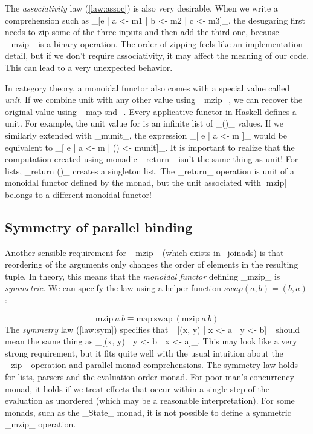 \documentclass{tmr}
\begin{document}
\UndefineShortVerb{\|}
\DefineShortVerb{\_}

The \textit{associativity} law (\ref{law:assoc}) is also very desirable. When we write a 
comprehension such as _[e | a <- m1 | b <- m2 | c <- m3]_, the desugaring first needs to zip some
of the three inputs and then add the third one, because _mzip_ is a binary operation. The order
of zipping feels like an implementation detail, but if we don't require associativity, it may 
affect the meaning of our code. This can lead to a very unexpected behavior.

In category theory, a monoidal functor also comes with a special value called 
\textit{unit}. If we combine unit with any other value using _mzip_, we can recover the original
value using _map snd_. Every applicative functor in Haskell defines a unit. For example,
the unit value for  is an infinite list of _()_ values. If we similarly extended 
 with _munit_, the expression _[ e | a <- m ]_ would be equivalent to
_[ e | a <- m | () <- munit]_. It is important to realize that the computation created using monadic 
_return_ isn't the same thing as unit! For lists, _return ()_ creates a singleton list. The 
_return_ operation is unit of a monoidal functor defined by the monad, but the unit associated 
with |mzip| belongs to a different monoidal functor! 


\subsection{Symmetry of parallel binding}

Another sensible requirement for _mzip_ (which exists in \fsharp \ joinads) is that reordering of 
the arguments only changes the order of elements in the resulting tuple. In theory, this means that 
the \textit{monoidal functor} defining _mzip_ is \textit{symmetric}. We can specify the law using a 
helper function $swap(a,b)=(b,a)$:

\begin{equation}
  \text{mzip} \: a \: b \equiv \text{map} \: \text{swap} \: (\text{mzip} \: a \: b)
  \label{law:sym}
\end{equation}
The \textit{symmetry} law (\ref{law:sym}) specifies that _[(x, y) | x <- a | y <- b]_ should mean 
the same thing as _[(x, y) | y <- b | x <- a]_. This may look like a very strong requirement, but 
it fits quite well with the usual intuition about the _zip_ operation and parallel monad 
comprehensions. The symmetry law holds for lists, parsers and the evaluation order monad. For poor 
man's concurrency monad, it holds if we treat effects that occur within a single step of the 
evaluation as unordered (which may be a reasonable interpretation). For some monads, such as the
_State_ monad, it is not possible to define a symmetric _mzip_ operation. 
\end{document}
